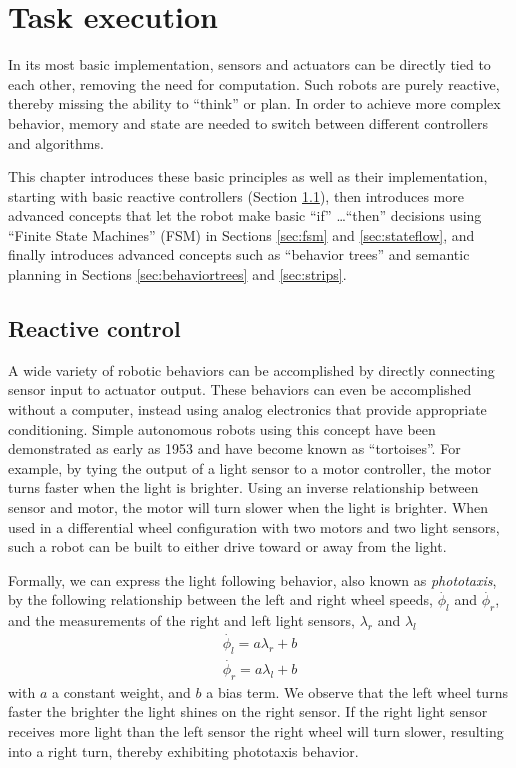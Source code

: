 \chapter{Task execution}\label{chap:taskexecution}
In its most basic implementation, sensors and actuators can be directly tied to each other, removing the need for computation. Such robots are purely reactive, thereby missing the ability to ``think'' or plan. In order to achieve more complex behavior, memory and state are needed to switch between different controllers and algorithms.

This chapter introduces these basic principles as well as their implementation, starting with basic reactive controllers (Section \ref{sec:braitenberg}), then introduces more advanced concepts that let the robot make basic ``if'' \ldots ``then'' decisions using ``Finite State Machines'' (FSM) in Sections \ref{sec:fsm} and \ref{sec:stateflow}, and finally introduces advanced concepts such as ``behavior trees'' and semantic planning in Sections \ref{sec:behaviortrees} and \ref{sec:strips}.

\section{Reactive control}\label{sec:braitenberg}
A wide variety of robotic behaviors can be accomplished by directly connecting sensor input to actuator output. These behaviors can even be accomplished without a computer, instead using analog electronics that provide appropriate conditioning. Simple autonomous robots using this concept have been demonstrated as early as 1953 \cite{walter1953living} and have become known as ``tortoises''. For example, by tying the output of a light sensor to a motor controller, the motor turns faster when the light is brighter. Using an inverse relationship between sensor and motor, the motor will turn slower when the light is brighter. When used in a differential wheel configuration with two motors and two light sensors, such a robot can be built to either drive toward or away from the light. 

Formally, we can express the light following behavior, also known as \emph{phototaxis}, by the following relationship between
the left and right wheel speeds, $\dot{\phi_l}$ and $\dot{\phi_r}$, and the measurements of the right and left light sensors, $\lambda_r$ and $\lambda_l$
\begin{eqnarray}\label{eq:simplereactive}
\dot{\phi_l}=a \lambda_r + b\\
\dot{\phi_r}=a \lambda_l + b
\end{eqnarray}
with $a$ a constant weight, and $b$ a bias term. We observe that the left wheel turns faster the brighter the light shines on the right sensor. If the right light sensor receives more light than the left sensor the right wheel will turn slower, resulting into a right turn, thereby exhibiting phototaxis behavior.

